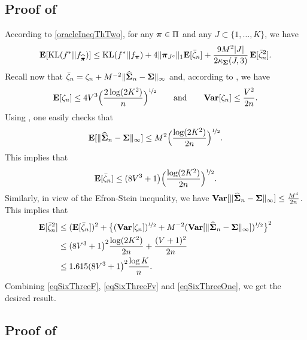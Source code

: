 \subsection{Proof of }

According to \eqref{oracleIneqThTwo}, for any $\boldsymbol \pi\in \Pi$ and
any $J\subset\{1,\dots,K\}$, we have
\begin{equation}\label{eqSixThreeOne}
\mathbf E[{\rm KL}(f^*|| f_{\widehat{\boldsymbol \pi}})] \leq {\rm KL}(f^*|| f_{\boldsymbol \pi}) + 4\| \boldsymbol \pi_{J^c}\|_1\mathbf E[\bar\zeta_n] +
\frac{9 M^2|J|}{2\kappa_{\boldsymbol\Sigma}(J,3)}\,\mathbf E[\bar\zeta_n^2].
\end{equation}
Recall now that $\bar\zeta_n = \zeta_n+M^{-2}\|\widehat{\boldsymbol\Sigma}_n-\boldsymbol\Sigma\|_{\infty}$ and, according to
, we have
\begin{equation}\label{eqSixThreeTw}
\mathbf E[\zeta_n] \leq 4V^3\Big(\frac{2\log(2K^2)}{n}\Big)^{\nicefrac12} \qquad\text{and}\qquad
{\bf Var}[\zeta_n] \leq \frac{V^2}{2n}.
\end{equation}
Using , one easily checks that
\begin{equation}\label{eqSixThreeTh}
\mathbf E[\|\widehat{\boldsymbol\Sigma}_n-\boldsymbol\Sigma\|_{\infty}] \leq M^2\Big(\frac{\log(2K^2)}{2n}\Big)^{\nicefrac12}.
\end{equation}
This implies that
\begin{equation}\label{eqSixThreeF}
\mathbf E[\bar\zeta_n] \leq (8V^3+1\big)\Big(\frac{\log(2K^2)}{2n}\Big)^{\nicefrac12}.
\end{equation}
Similarly, in view of the Efron-Stein inequality, we have
${\bf Var}[\|\widehat{\boldsymbol\Sigma}_n-\boldsymbol\Sigma\|_{\infty}]\le \frac{M^4}{2n}$. This implies that
\begin{align}
\mathbf E[\bar\zeta_n^2]
&\leq (\mathbf E[\bar\zeta_n])^2 + \big\{({\bf Var}[\zeta_n])^{\nicefrac12}+
M^{-2}({\bf Var}[\|\widehat{\boldsymbol\Sigma}_n-\boldsymbol\Sigma\|_{\infty}])^{\nicefrac12}\big\}^2 \\
&\le (8V^3+1\big)^2\frac{\log(2K^2)}{2n} + \frac{(V+1)^2}{2n}\\
&\le 1.615(8V^3+1\big)^2\frac{\log K}{n}.\label{eqSixThreeFv}
\end{align}
Combining \eqref{eqSixThreeF}, \eqref{eqSixThreeFv} and \eqref{eqSixThreeOne}, we get the desired result.

\subsection{Proof of }


